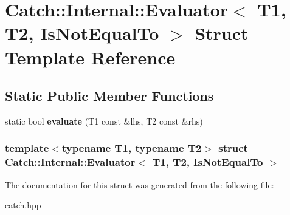 \hypertarget{structCatch_1_1Internal_1_1Evaluator_3_01T1_00_01T2_00_01IsNotEqualTo_01_4}{
\section{Catch::Internal::Evaluator$<$ T1, T2, IsNotEqualTo $>$ Struct Template Reference}
\label{structCatch_1_1Internal_1_1Evaluator_3_01T1_00_01T2_00_01IsNotEqualTo_01_4}
}
\subsection*{Static Public Member Functions}
\begin{DoxyCompactItemize}
\item 
\hypertarget{structCatch_1_1Internal_1_1Evaluator_3_01T1_00_01T2_00_01IsNotEqualTo_01_4_a956a12d0f4a7dceb5a1ce914421ff945}{
static bool {\bfseries evaluate} (T1 const \&lhs, T2 const \&rhs)}
\label{structCatch_1_1Internal_1_1Evaluator_3_01T1_00_01T2_00_01IsNotEqualTo_01_4_a956a12d0f4a7dceb5a1ce914421ff945}

\end{DoxyCompactItemize}
\subsubsection*{template$<$typename T1, typename T2$>$ struct Catch::Internal::Evaluator$<$ T1, T2, IsNotEqualTo $>$}



The documentation for this struct was generated from the following file:\begin{DoxyCompactItemize}
\item 
catch.hpp\end{DoxyCompactItemize}
